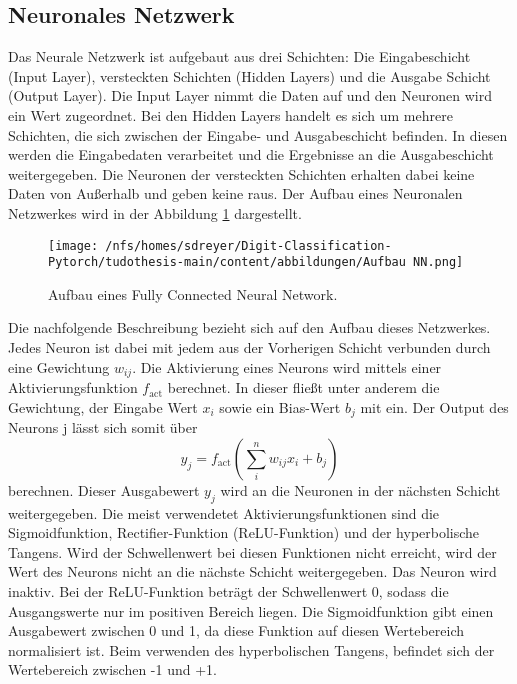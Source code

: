 \subsection{Neuronales Netzwerk}
Das Neurale Netzwerk ist aufgebaut aus drei Schichten: 
Die Eingabeschicht (Input Layer), versteckten Schichten (Hidden Layers) und die Ausgabe Schicht (Output Layer).
Die Input Layer nimmt die Daten auf und den Neuronen wird ein Wert zugeordnet.
Bei den Hidden Layers handelt es sich um mehrere Schichten, die sich zwischen der Eingabe- und Ausgabeschicht befinden.
In diesen werden die Eingabedaten verarbeitet und die Ergebnisse an die Ausgabeschicht weitergegeben.
Die Neuronen der versteckten Schichten erhalten dabei keine Daten von Außerhalb und geben keine raus. 
Der Aufbau eines Neuronalen Netzwerkes wird in der Abbildung \ref{fig:NN} dargestellt.
\begin{figure}[H]
  \centering
  \texttt{[image: /nfs/homes/sdreyer/Digit-Classification-Pytorch/tudothesis-main/content/abbildungen/Aufbau NN.png]}
  \caption{Aufbau eines Fully Connected Neural Network.~\cite{lecun2015deep}}
  \label{fig:NN}
\end{figure}
Die nachfolgende Beschreibung bezieht sich auf den Aufbau dieses Netzwerkes.
Jedes Neuron ist dabei mit jedem aus der Vorherigen Schicht verbunden durch eine Gewichtung $w_{ij}$.
Die Aktivierung eines Neurons wird mittels einer Aktivierungsfunktion $f_\text{act}$ berechnet. In dieser fließt unter anderem die Gewichtung, 
der Eingabe Wert $x_i$ sowie ein Bias-Wert $b_j$ mit ein.
Der Output des Neurons j lässt sich somit über 
\begin{equation}
    y_j = f_\text{act}\left(\sum_{i}^{n} w_{ij}x_i + b_j\right)
\end{equation}
berechnen.
Dieser Ausgabewert $y_j$ wird an die Neuronen in der nächsten Schicht weitergegeben.
Die meist verwendetet Aktivierungsfunktionen sind die Sigmoidfunktion, Rectifier-Funktion (ReLU-Funktion) und der hyperbolische Tangens.
Wird der Schwellenwert bei diesen Funktionen nicht erreicht, wird der Wert des Neurons nicht an die nächste Schicht weitergegeben.
Das Neuron wird inaktiv.
Bei der ReLU-Funktion beträgt der Schwellenwert 0, sodass die Ausgangswerte nur im positiven Bereich liegen.
Die Sigmoidfunktion gibt einen Ausgabewert zwischen 0 und 1, da diese Funktion auf diesen Wertebereich normalisiert ist.
Beim verwenden des hyperbolischen Tangens, befindet sich der Wertebereich zwischen -1 und +1.~\cite{datascience}

